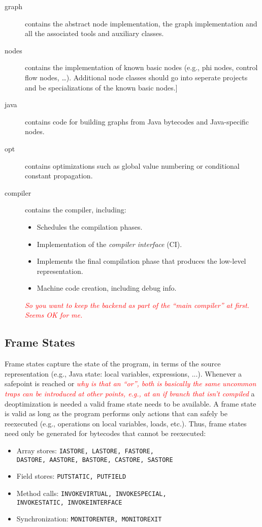\documentclass[twocolumn]{svjour3}
\newcommand{\mynote}[2]{
\textcolor{red}{\fbox{\bfseries\sffamily\scriptsize#1}
  {\small\textsf{\emph{#2}}}
\fbox{\bfseries\sffamily\scriptsize }}}
\newcommand\cw[1]{\mynote{CW}{#1}}
\newcommand\ls[1]{\mynote{LS}{#1}}
\begin{document}
\begin{description}
    \item[graph] contains the abstract node implementation, the graph implementation and all the associated tools and auxiliary classes.
    \item[nodes] contains the implementation of known basic nodes (e.g., phi nodes, control flow nodes, \ldots).
 				 Additional node classes should go into seperate projects and be specializations of the known basic nodes.]
    \item[java] contains code for building graphs from Java bytecodes and Java-specific nodes.
    \item[opt] contains optimizations such as global value numbering or conditional constant propagation.
    \item[compiler] contains the compiler, including:
        \begin{itemize}
            \item Schedules the compilation phases.
            \item Implementation of the \emph{compiler interface} (CI).
            \item Implements the final compilation phase that produces the low-level representation.
            \item Machine code creation, including debug info.
        \end{itemize}
		\cw{So you want to keep the backend as part of the ``main compiler'' at first.  Seems OK for me.}
\end{description}


\subsection{Frame States}
Frame states capture the state of the program, in terms of the source representation (e.g., Java state: local variables, expressions, ...).
Whenever a safepoint is reached or \cw{why is that an ``or'', both is basically the same} \ls{uncommon traps can be introduced at other points, e.g., at an if branch that isn't compiled} a deoptimization is needed a valid frame state needs to be available.
A frame state is valid as long as the program performs only actions that can safely be reexecuted (e.g., operations on local variables, loads, etc.).
Thus, frame states need only be generated for bytecodes that cannot be reexecuted:

\begin{itemize}
    \item Array stores: {\tt IASTORE, LASTORE, FASTORE, \\DASTORE, AASTORE, BASTORE, CASTORE, SASTORE}
    \item Field stores: {\tt PUTSTATIC, PUTFIELD}
    \item Method calls: {\tt INVOKEVIRTUAL, INVOKESPECIAL, \\INVOKESTATIC, INVOKEINTERFACE}
    \item Synchronization: {\tt MONITORENTER, MONITOREXIT}
\end{itemize}
\end{document}
